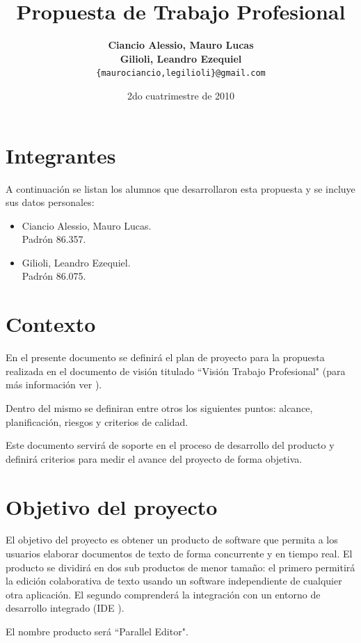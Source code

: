 \documentclass[12pt,a4paper]{article}
\title { \textbf{Propuesta de Trabajo Profesional}}
\date{2do cuatrimestre de 2010}
\author{\textbf{Ciancio Alessio, Mauro Lucas} \\
		\textbf{Gilioli, Leandro Ezequiel}	  \\
		\texttt{\{maurociancio,legilioli\}@gmail.com}
	}
\begin{document}
\maketitle
\tableofcontents
\newpage

	\section{Integrantes}

A continuación se listan los alumnos que desarrollaron esta propuesta y se incluye sus datos personales:

	\begin{itemize}
		\item Ciancio Alessio, Mauro Lucas. \\
		      Padrón 86.357.
		\item Gilioli, Leandro Ezequiel. \\
		      Padrón 86.075.
	\end{itemize}

	\section{Contexto}

	En el presente documento se definirá el plan de proyecto para la propuesta realizada en el documento de visión titulado ``Visión Trabajo Profesional" (para más información ver \cite{visiontpprof}). 

	Dentro del mismo se definiran entre otros los siguientes puntos: alcance, planificación, riesgos y criterios de calidad. 

	Este documento servirá de soporte en el proceso de desarrollo del producto y definirá criterios para medir el avance del proyecto de forma objetiva.	
		
	\section{Objetivo del proyecto}

El objetivo del proyecto es obtener un producto de software que permita a los usuarios elaborar documentos de texto de forma concurrente y en tiempo real. El producto se dividirá en dos sub productos de menor tamaño: el primero permitirá la edición colaborativa de texto usando un software independiente de cualquier otra aplicación. El segundo comprenderá la integración con un entorno de desarrollo integrado (IDE \cite{ide}).

El nombre producto será ``Parallel Editor".
\end{document}
